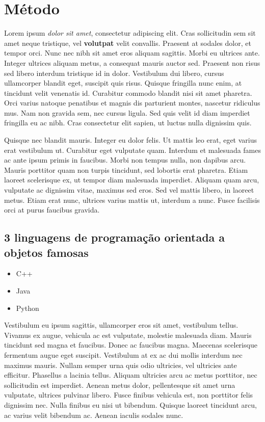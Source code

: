 \section{Método}
 {\LARGE Lorem ipsum \textit{dolor sit amet}}, consectetur adipiscing elit. Cras sollicitudin sem sit amet neque tristique, vel \textbf{volutpat} velit convallis. {\footnotesize Praesent at sodales dolor}, et tempor orci. Nunc nec nibh sit {\Large amet eros} aliquam sagittis. 
 { \ttfamily
 Morbi eu ultrices ante. Integer ultrices aliquam metus, a consequat mauris auctor sed.
 }
 Praesent non risus sed libero interdum tristique id in dolor. Vestibulum dui libero, cursus ullamcorper blandit eget, suscipit quis risus. Quisque fringilla nunc enim, at tincidunt velit venenatis id. Curabitur commodo blandit nisi sit amet pharetra. Orci varius natoque penatibus et magnis dis parturient montes, nascetur ridiculus mus. Nam non gravida sem, nec cursus ligula. Sed quis velit id diam imperdiet fringilla eu ac nibh. Cras consectetur elit sapien, ut luctus nulla dignissim quis.

Quisque nec blandit mauris. Integer eu dolor felis. Ut mattis leo erat, eget varius erat vestibulum ut. Curabitur eget vulputate quam. Interdum et malesuada fames ac ante ipsum primis in faucibus. Morbi non tempus nulla, non dapibus arcu. Mauris porttitor quam non turpis tincidunt, sed lobortis erat pharetra. Etiam laoreet scelerisque ex, ut tempor diam malesuada imperdiet. Aliquam quam arcu, vulputate ac dignissim vitae, maximus sed eros. Sed vel mattis libero, in laoreet metus. Etiam erat nunc, ultrices varius mattis ut, interdum a nunc. Fusce facilisis orci at purus faucibus gravida.

\subsection*{3 linguagens de programação orientada a objetos famosas}
\begin{itemize}
    \item C++
    \item Java
    \item Python
\end{itemize}

Vestibulum eu ipsum sagittis, ullamcorper eros sit amet, vestibulum tellus. Vivamus ex augue, vehicula ac est vulputate, molestie malesuada diam. Mauris tincidunt sed magna et faucibus. Donec ac faucibus magna. Maecenas scelerisque fermentum augue eget suscipit. Vestibulum at ex ac dui mollis interdum nec maximus mauris. Nullam semper urna quis odio ultricies, vel ultricies ante efficitur. Phasellus a lacinia tellus. Aliquam ultricies arcu ac metus porttitor, nec sollicitudin est imperdiet. Aenean metus dolor, pellentesque sit amet urna vulputate, ultrices pulvinar libero. Fusce finibus vehicula est, non porttitor felis dignissim nec. Nulla finibus eu nisi ut bibendum. Quisque laoreet tincidunt arcu, ac varius velit bibendum ac. Aenean iaculis sodales nunc. 